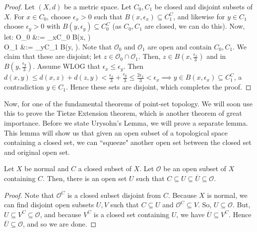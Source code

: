 	\begin{proof}
		Let $(X, d)$ be a metric space. Let $C_0, C_1$ be closed and disjoint subsets of $X$. For $x\in C_0$, choose 
		$\epsilon_x > 0$ such that $B(x, \epsilon_x)\subseteq C_1^C$, and likewise for $y\in C_1$ choose $\epsilon_y > 0$ 
		with $B(y, \epsilon_y)\subseteq C_0^C$ (as $C_0, C_1$ are closed, we can do this). Now, let:
		\eq
			\mathcal O_0 &:= \bigcup_{x\in C_0} B\left(x,  \right) \\
			\mathcal O_1 &:= \bigcup_{y\in C_1} B\left(y,  \right).
		\qe
		Note that $\mathcal O_0$ and $\mathcal O_1$ are open and contain $C_0, C_1$. We claim that these are disjoint; 
		let $z\in\mathcal O_0\cap\mathcal O_1$. Then, $z\in B(x, \frac{\epsilon_x}{3})$ and in $B(y, \frac{\epsilon_y}{3})$. 
		Assume WLOG that $\epsilon_x \leq\epsilon_y$. Then $d(x, y)\leq d(x, z) + d(z, y) < \frac{\epsilon_x}{3} + 
		\frac{\epsilon_y}{3} \leq \frac{2\epsilon_x}{3} < \epsilon_x\implies y\in B(x, \epsilon_x)\subseteq C_1^C$, a 
		contradiction $y\in C_1$. Hence these sets are disjoint, which completes the proof.
	\end{proof}
	
	Now, for one of the fundamental theorems of point-set topology. We will soon use this to prove the Tietze Extension 
	theorem, which is another theorem of great importance. Before we state Urysohn's Lemma, we will prove a separate 
	lemma. This lemma will show us that given an open subset of a topological space containing a closed set, we can 
	``squeeze" another open set between the closed set and original open set. 
	
	\begin{lemma}
		Let $X$ be normal and $C$ a closed subset of $X$. Let $\mathcal O$ be an open subset of $X$ containing $C$. 
		Then, there is an open set $U$ such that $C\subseteq U\subseteq\overline U\subseteq\mathcal O$.
	\end{lemma}
	
	\begin{proof}
		Note that $\mathcal O^C$ is a closed subset disjoint from $C$. Because $X$ is normal, we can find disjoint open 
		subsets $U, V$ such that $C\subseteq U$ and $\mathcal O^C\subseteq V$. So, $U\subseteq\mathcal O$. But, $U
		\subseteq V^C\subseteq\mathcal O$, and because $V^C$ is a closed set containing $U$, we have $\overline U
		\subseteq V^C$. Hence $\overline U\subseteq\mathcal O$, and so we are done.
	\end{proof}
	
